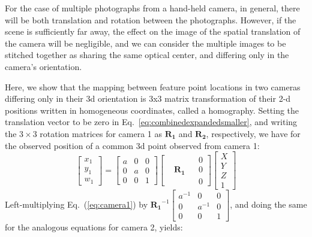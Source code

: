 For the case of multiple photographs from a hand-held camera, in general, there will be both translation and rotation between the photographs.  However, if the scene is sufficiently far away, the effect on the image of the spatial translation of the camera will be negligible, and we can consider the multiple images to be stitched together as sharing the same optical center, and differing only in the camera's orientation.

Here, we show that the mapping between feature point locations in two cameras differing only in their 3d orientation is 3x3 matrix transformation of their 2-d positions written in homogeneous coordinates, called a homography. Setting the translation vector to be zero in Eq.~\ref{eq:combinedexpandedsmaller}, and writing the $3\times3$ rotation matrices for camera 1 as $\mathbf{R_1}$ and $\mathbf{R_2}$, respectively, we have for the observed position of a common 3d point observed from camera 1:
\begin{equation}
        \left [
    \begin{array}{c}
    x_1 \\
    y_1 \\
    w_1
    \end{array}
    \right ] 
=
 \left [
    \begin{array}{ccc}
    a & 0 & 0  \\
    0 & a & 0  \\
    0 & 0 & 1 
    \end{array}
    \right ]
     \left [
    \begin{array}{cccc}
     &  &   & 0 \\
     & \mathbf{R_1} &  & 0 \\
     &  &  & 0
    \end{array}
    \right ]
        \left [
    \begin{array}{c}
    X \\
    Y \\
    Z \\
    1
    \end{array}
    \right ] 
    \label{eq:camera1}
\end{equation}
Left-multiplying Eq.~(\ref{eq:camera1}) by 
$\mathbf{R_1}^{-1} 
\left [
    \begin{array}{ccc}
    a^{-1} & 0 & 0  \\
    0 & a^{-1} & 0  \\
    0 & 0 & 1 
    \end{array}
    \right ] $,
    and doing the same for the analogous equations for camera 2, yields:
